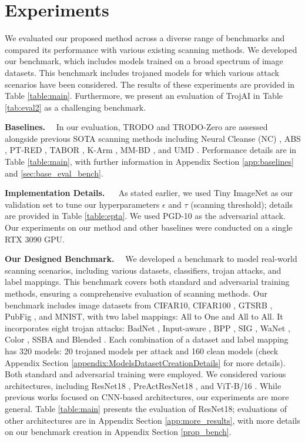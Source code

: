 \section{Experiments}
\label{sec:experiments}



We evaluated our proposed method across a diverse range of benchmarks and compared its performance with various existing scanning methods. We developed our benchmark, which includes models trained on a broad spectrum of image datasets. This benchmark includes trojaned models for which various attack scenarios have been considered. The results of these experiments are provided in Table \ref{table:main}. Furthermore, we present an evaluation of TrojAI in Table \ref{tab:eval2} as a challenging benchmark.





\textbf{Baselines.} \ \ In our evaluation, TRODO and TRODO-Zero are assessed alongside previous SOTA scanning methods including Neural Cleanse (NC) \cite{NC}, ABS \cite{ABS}, PT-RED \cite{PTRED}, TABOR \cite{TABOR}, K-Arm \cite{kARM}, MM-BD \cite{MMBD}, and UMD \cite{umd}. Performance details are in Table \ref{table:main}, with further information in Appendix Section \ref{app:baselines} and \ref{sec:base_eval_bench}.


\textbf{Implementation Details.} \ \
\label{implementation_details} As stated earlier, we used Tiny ImageNet as our validation set to tune our hyperparameters $\epsilon$ and $\tau$ (scanning threshold); details are provided in Table \ref{table:epta}. We used PGD-10 as the adversarial attack. Our experiments on our method and other baselines were conducted on a single RTX 3090 GPU.


\textbf{Our Designed Benchmark.} \ \
We developed a benchmark to model real-world scanning scenarios, including various datasets, classifiers, trojan attacks, and label mappings. This benchmark covers both standard and adversarial training methods, ensuring a comprehensive evaluation of scanning methods. Our benchmark includes image datasets from CIFAR10, CIFAR100 \cite{cifar}, GTSRB \cite{gtsrb}, PubFig \cite{pubfig}, and MNIST, with two label mappings: All to One and All to All. It incorporates eight trojan attacks: BadNet \cite{badnets}, Input-aware \cite{inputaware}, BPP \cite{bpp}, SIG \cite{sig}, WaNet \cite{wanet}, Color \cite{color}, SSBA \cite{ssba} and Blended \cite{blended}. Each combination of a dataset and label mapping has 320 models: 20 trojaned models per attack and 160 clean models (check Appendix Section \ref{appendix:ModelsDatasetCreationDetails} for more details). Both standard and adversarial training were employed. We considered various architectures, including ResNet18 \cite{resnet}, PreActResNet18 \cite{preact}, and ViT-B/16 \cite{vit}. While previous works focused on CNN-based architectures, our experiments are more general. Table \ref{table:main} presents the evaluation of ResNet18; evaluations of other architectures are in Appendix Section \ref{app:more_results}, with more details on our benchmark creation in Appendix Section \ref{prop_bench}.

